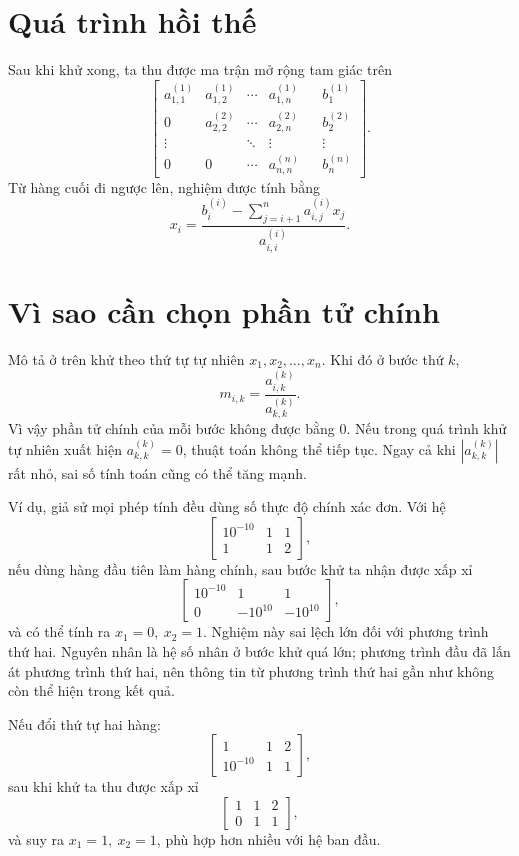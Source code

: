 \documentclass[11pt]{article}
\begin{document}
\section{Quá trình hồi thế}

Sau khi khử xong, ta thu được ma trận mở rộng tam giác trên
\[
\left[
\begin{array}{ccccc|c}
a_{1,1}^{(1)} & a_{1,2}^{(1)} & \cdots & a_{1,n}^{(1)} & & b_1^{(1)}\\
0 & a_{2,2}^{(2)} & \cdots & a_{2,n}^{(2)} & & b_2^{(2)}\\
\vdots & & \ddots & \vdots & & \vdots\\
0 & 0 & \cdots & a_{n,n}^{(n)} & & b_n^{(n)}
\end{array}
\right].
\]
Từ hàng cuối đi ngược lên, nghiệm được tính bằng
\[
  x_i=
  \frac{
    b_i^{(i)}-\sum_{j=i+1}^{n}a_{i,j}^{(i)}x_j
  }{
    a_{i,i}^{(i)}
  }.
\]

\section{Vì sao cần chọn phần tử chính}

Mô tả ở trên khử theo thứ tự tự nhiên \(x_1,x_2,\ldots,x_n\). Khi đó ở bước
thứ \(k\),
\[
  m_{i,k}=\frac{a_{i,k}^{(k)}}{a_{k,k}^{(k)}}.
\]
Vì vậy phần tử chính của mỗi bước không được bằng \(0\). Nếu trong quá trình
khử tự nhiên xuất hiện \(a_{k,k}^{(k)}=0\), thuật toán không thể tiếp tục.
Ngay cả khi \(|a_{k,k}^{(k)}|\) rất nhỏ, sai số tính toán cũng có thể tăng
mạnh.

Ví dụ, giả sử mọi phép tính đều dùng số thực độ chính xác đơn. Với hệ
\[
\left[
\begin{array}{cc|c}
10^{-10} & 1 & 1\\
1 & 1 & 2
\end{array}
\right],
\]
nếu dùng hàng đầu tiên làm hàng chính, sau bước khử ta nhận được xấp xỉ
\[
\left[
\begin{array}{cc|c}
10^{-10} & 1 & 1\\
0 & -10^{10} & -10^{10}
\end{array}
\right],
\]
và có thể tính ra \(x_1=0,\ x_2=1\). Nghiệm này sai lệch lớn đối với phương
trình thứ hai. Nguyên nhân là hệ số nhân ở bước khử quá lớn; phương trình đầu
đã lấn át phương trình thứ hai, nên thông tin từ phương trình thứ hai gần như
không còn thể hiện trong kết quả.

Nếu đổi thứ tự hai hàng:
\[
\left[
\begin{array}{cc|c}
1 & 1 & 2\\
10^{-10} & 1 & 1
\end{array}
\right],
\]
sau khi khử ta thu được xấp xỉ
\[
\left[
\begin{array}{cc|c}
1 & 1 & 2\\
0 & 1 & 1
\end{array}
\right],
\]
và suy ra \(x_1=1,\ x_2=1\), phù hợp hơn nhiều với hệ ban đầu.
\end{document}
